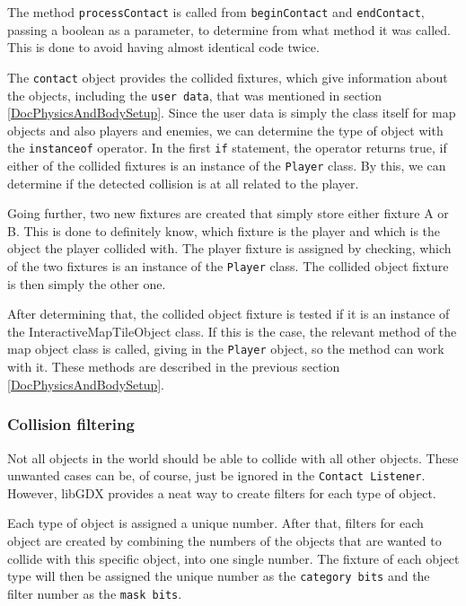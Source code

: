 \documentclass[12p]{article}
\begin{document}
The method \texttt{processContact} is called from \texttt{beginContact} and \texttt{endContact}, passing a boolean as a parameter, to determine from what method it was called. This is done to avoid having almost identical code twice.

The \texttt{contact} object provides the collided fixtures, which give information about the objects, including the \texttt{user data}, that was mentioned in section \ref{DocPhysicsAndBodySetup}. Since the user data is simply the class itself for map objects and also players and enemies, we can determine the type of object with the \texttt{instanceof} operator. In the first \texttt{if} statement, the operator returns true, if either of the collided fixtures is an instance of the \texttt{Player} class. By this, we can determine if the detected collision is at all related to the player.

Going further, two new fixtures are created that simply store either fixture A or B. This is done to definitely know, which fixture is the player and which is the object the player collided with. The player fixture is assigned by checking, which of the two fixtures is an instance of the \texttt{Player} class. The collided object fixture is then simply the other one.

After determining that, the collided object fixture is tested if it is an instance of the InteractiveMapTileObject class. If this is the case, the relevant method of the map object class is called, giving in the \texttt{Player} object, so the method can work with it. These methods are described in the previous section \ref{DocPhysicsAndBodySetup}.


\subsubsection{Collision filtering}

Not all objects in the world should be able to collide with all other objects. These unwanted cases can be, of course, just be ignored in the \texttt{Contact Listener}. However, libGDX provides a neat way to create filters for each type of object.

Each type of object is assigned a unique number. After that, filters for each object are created by combining the numbers of the objects that are wanted to collide with this specific object, into one single number. The fixture of each object type will then be assigned the unique number as the \texttt{category bits} and the filter number as the \texttt{mask bits}.
\end{document}
